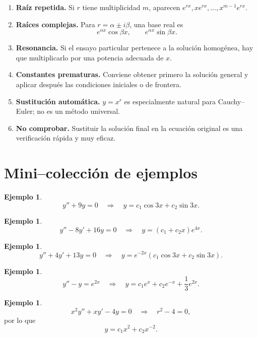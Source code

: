 \documentclass[11pt]{article}
\theoremstyle{definition}
\newtheorem{ejemplo}[teorema]{Ejemplo}
\begin{document}
\begin{enumerate}
\item \textbf{Raíz repetida.} Si $r$ tiene multiplicidad $m$, aparecen
$e^{rx},xe^{rx},\ldots,x^{m-1}e^{rx}$.

\item \textbf{Raíces complejas.} Para $r=\alpha\pm i\beta$, una base real es
\[
e^{\alpha x}\cos\beta x,\qquad e^{\alpha x}\sin\beta x.
\]

\item \textbf{Resonancia.} Si el ensayo particular pertenece a la solución
homogénea, hay que multiplicarlo por una potencia adecuada de $x$.

\item \textbf{Constantes prematuras.} Conviene obtener primero la solución general
y aplicar después las condiciones iniciales o de frontera.

\item \textbf{Sustitución automática.} $y=x^r$ es especialmente natural para
Cauchy--Euler; no es un método universal.

\item \textbf{No comprobar.} Sustituir la solución final en la ecuación original
es una verificación rápida y muy eficaz.
\end{enumerate}

\section{Mini--colección de ejemplos}

\begin{ejemplo}
\[
y''+9y=0
\quad\Longrightarrow\quad
\boxed{y=c_1\cos3x+c_2\sin3x}.
\]
\end{ejemplo}

\begin{ejemplo}
\[
y''-8y'+16y=0
\quad\Longrightarrow\quad
\boxed{y=(c_1+c_2x)e^{4x}}.
\]
\end{ejemplo}

\begin{ejemplo}
\[
y''+4y'+13y=0
\quad\Longrightarrow\quad
\boxed{y=e^{-2x}(c_1\cos3x+c_2\sin3x)}.
\]
\end{ejemplo}

\begin{ejemplo}
\[
y''-y=e^{2x}
\quad\Longrightarrow\quad
\boxed{y=c_1e^x+c_2e^{-x}+\frac13e^{2x}}.
\]
\end{ejemplo}

\begin{ejemplo}
\[
x^2y''+xy'-4y=0
\quad\Longrightarrow\quad
r^2-4=0,
\]
por lo que
\[
\boxed{y=c_1x^2+c_2x^{-2}}.
\]
\end{ejemplo}
\end{document}

